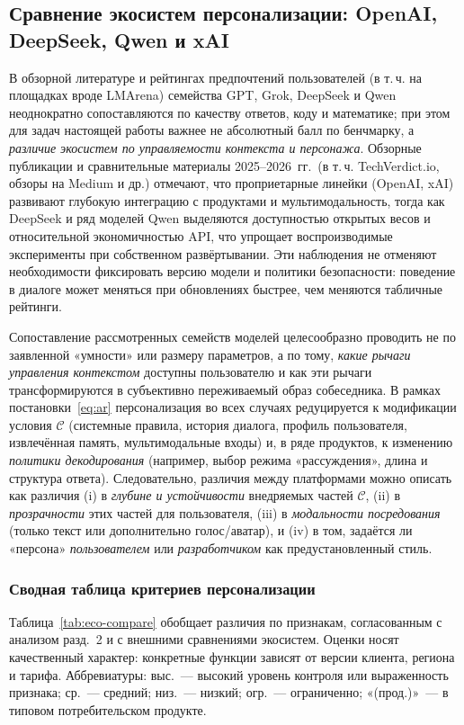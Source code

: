 \documentclass[areasetadvanced]{scrartcl}
\begin{document}
  \subsection{Сравнение экосистем персонализации: OpenAI, DeepSeek, Qwen и xAI}
  
  В обзорной литературе и рейтингах предпочтений пользователей (в т.\,ч. на площадках вроде LMArena) семейства GPT, Grok, DeepSeek и Qwen неоднократно сопоставляются по качеству ответов, коду и математике; при этом для задач настоящей работы важнее не абсолютный балл по бенчмарку, а \emph{различие экосистем по управляемости контекста и персонажа}. Обзорные публикации и сравнительные материалы 2025--2026~гг.\ (в т.\,ч. TechVerdict.io, обзоры на Medium и др.) отмечают, что проприетарные линейки (OpenAI, xAI) развивают глубокую интеграцию с продуктами и мультимодальность, тогда как DeepSeek и ряд моделей Qwen выделяются доступностью открытых весов и относительной экономичностью API, что упрощает воспроизводимые эксперименты при собственном развёртывании. Эти наблюдения не отменяют необходимости фиксировать версию модели и политики безопасности: поведение в диалоге может меняться при обновлениях быстрее, чем меняются табличные рейтинги.
  
  Сопоставление рассмотренных семейств моделей целесообразно проводить не по заявленной «умности» или размеру параметров, а по тому, \emph{какие рычаги управления контекстом} доступны пользователю и как эти рычаги трансформируются в субъективно переживаемый образ собеседника. В рамках постановки~\eqref{eq:ar} персонализация во всех случаях редуцируется к модификации условия $\mathcal{C}$ (системные правила, история диалога, профиль пользователя, извлечённая память, мультимодальные входы) и, в ряде продуктов, к изменению \emph{политики декодирования} (например, выбор режима «рассуждения», длина и структура ответа). Следовательно, различия между платформами можно описать как различия (i) в \emph{глубине и устойчивости} внедряемых частей $\mathcal{C}$, (ii) в \emph{прозрачности} этих частей для пользователя, (iii) в \emph{модальности посредования} (только текст или дополнительно голос/аватар), и (iv) в том, задаётся ли «персона» \emph{пользователем} или \emph{разработчиком} как предустановленный стиль.

  \subsubsection{Сводная таблица критериев персонализации}

  Таблица~\ref{tab:eco-compare} обобщает различия по признакам, согласованным с анализом разд.~2 и с внешними сравнениями экосистем. Оценки носят качественный характер: конкретные функции зависят от версии клиента, региона и тарифа. Аббревиатуры: выс.~--- высокий уровень контроля или выраженность признака; ср.~--- средний; низ.~--- низкий; огр.~--- ограниченно; «(прод.)»~--- в типовом потребительском продукте.
\end{document}
